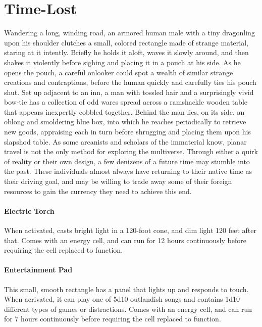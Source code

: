 \documentclass[10pt,a4paper,twoside,twocolumn,openany,nodeprecatedcode,bg=print]{dndbook}
\begin{document}
\section{Time-Lost}
Wandering a long, winding road, an armored human male with a tiny dragonling upon his shoulder clutches a small, colored rectangle made of strange material, staring at it intently. Briefly he holds it aloft, waves it slowly around, and then shakes it violently before sighing and placing it in a pouch at his side. As he opens the pouch, a careful onlooker could spot a wealth of similar strange creations and contraptions, before the human quickly and carefully ties his pouch shut.
Set up adjacent to an inn, a man with tossled hair and a surprisingly vivid bow-tie has a collection of odd wares spread across a ramshackle wooden table that appears inexpertly cobbled together. Behind the man lies, on its side, an oblong and smoldering blue box, into which he reaches periodically to retrieve new goods, appraising each in turn before shrugging and placing them upon his slapshod table.
As some arcanists and scholars of the immaterial know, planar travel is not the only method for exploring the multiverse. Through either a quirk of reality or their own design, a few denizens of a future time may stumble into the past. These individuals almost always have returning to their native time as their driving goal, and may be willing to trade away some of their foreign resources to gain the currency they need to achieve this end.
\paragraph{Electric Torch}
When activated, casts bright light in a 120-foot cone, and dim light 120 feet after that. Comes with an energy cell, and can run for 12 hours continuously before requiring the cell replaced to function.
\paragraph{Entertainment Pad}
This small, smooth rectangle has a panel that lights up and responds to touch. When acrivated, it can play one of 5d10 outlandish songs and contains 1d10 different types of games or distractions. Comes with an energy cell, and can run for 7 hours continuously before requiring the cell replaced to function.
\end{document}
